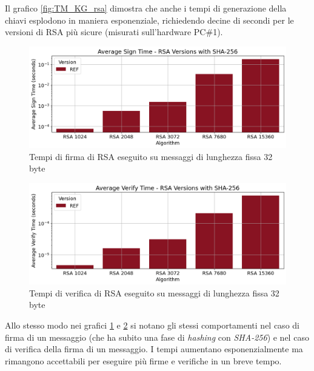 Il grafico \ref{fig:TM_KG_rsa} dimostra che anche i tempi di generazione della chiavi esplodono in maniera esponenziale, richiedendo decine di secondi per le versioni di RSA più sicure (misurati sull'hardware PC\#1).

\begin{figure}[H]
    \centering
    \includegraphics[width=1\textwidth]{Immagini/20240822_i9/Time_Sign/TM_SG_H_rsa_sha256.png}
    \caption{Tempi di firma di RSA eseguito su messaggi di lunghezza fissa 32 byte}
    \label{fig:TM_SG_H_rsa_sha256}
\end{figure}

\begin{figure}[H]
    \centering
    \includegraphics[width=1\textwidth]{Immagini/20240822_i9/Time_Verify/TM_VF_H_rsa_sha256.png}
    \caption{Tempi di verifica di RSA eseguito su messaggi di lunghezza fissa 32 byte}
    \label{fig:TM_VF_H_rsa_sha256}
\end{figure}

Allo stesso modo nei grafici \ref{fig:TM_SG_H_rsa_sha256} e \ref{fig:TM_VF_H_rsa_sha256} si notano gli stessi comportamenti nel caso di firma di un messaggio (che ha subito una fase di \textit{hashing} con \textit{SHA-256}) e nel caso di verifica della firma di un messaggio. I tempi aumentano esponenzialmente ma rimangono accettabili per eseguire più firme e verifiche in un breve tempo.

